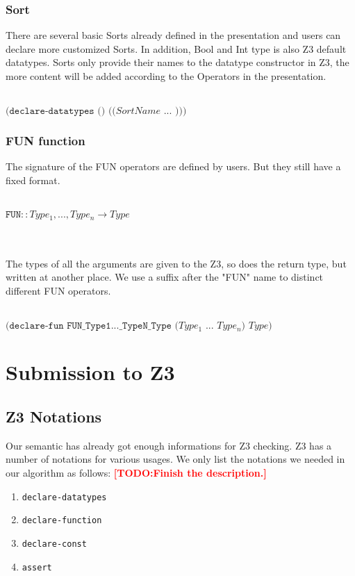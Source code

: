 \documentclass[a4paper]{lncs/llncs}
\newcommand{\TODO}[1]{\textcolor{red}{\textbf{[TODO:#1]}}}
\begin{document}
\subsubsection{Sort}
There are several basic Sorts already defined in the presentation and users can declare more customized Sorts. In addition, Bool and Int type is also Z3 default datatypes. Sorts only provide their names to the datatype constructor in Z3, the more content will be added according to the Operators in the presentation.\\\\
\centerline{$\texttt{(declare-datatypes\ ()\ (($SortName$\ ...\ )))}$}
\subsubsection{FUN function}
The signature of the FUN operators are defined by users. But they still have a fixed format.\\\\
\centerline{$\texttt{FUN} :: Type_1, ... ,Type_n \longrightarrow Type$}\\\\
The types of all the arguments are given to the Z3, so does the return type, but written at another place.  We use a suffix after the "FUN" name to distinct different FUN operators.\\\\
\centerline{$\texttt{(declare-fun\ FUN\_Type1...\_TypeN\_Type\ ($Type_1$\ ... \ $Type_n$)\ $Type$)}$}

\section{Submission to Z3}
\subsection{Z3 Notations}
Our semantic has already got enough informations for Z3 checking. Z3 has a number of notations for various usages. We only list the notations we needed in our algorithm as follows:
\TODO{Finish the description.}
\begin{enumerate}
\item \texttt{declare-datatypes}
\item \texttt{declare-function}
\item \texttt{declare-const}
\item \texttt{assert}
\end{enumerate}
\end{document}
